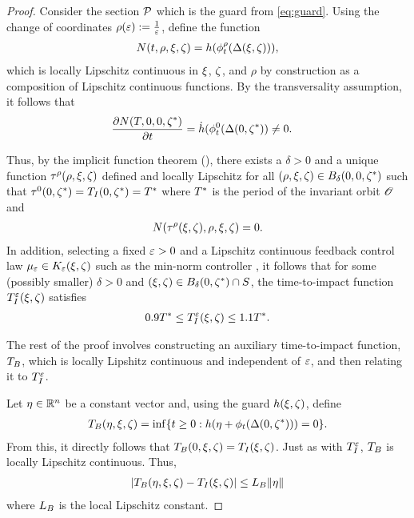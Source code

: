 \begin{proof}
  Consider the \Poincare{} section $\mathcal{P}$ which is the guard from
  \eqref{eq:guard}.
  Using the change of coordinates $\rho(\varepsilon) :=
  \tfrac{1}{\varepsilon}$, define the function
  \begin{align*}
    N(t, \rho, \xi, \zeta) = h(\phi^{\rho}_{t}(\Delta(\xi, \zeta))),
  \end{align*}
  which is locally Lipschitz continuous in $\xi$, $\zeta$, and $\rho$ by
  construction as a composition of Lipschitz continuous functions.
  By the transversality assumption, it follows that
  \begin{align*}
    \frac{\partial{N(T, 0, 0, \zeta^{*})}}{\partial{t}} &= \dot h(\phi^{0}_{t} (\Delta(0, \zeta^{*})) \ne
    0.
  \end{align*}

  Thus, by the implicit function theorem (\cite{Sun2001}), there exists a
  $\delta > 0$ and a unique function $\tau^{\rho}(\rho, \xi, \zeta)$ defined and
  locally Lipschitz for all $(\rho, \xi, \zeta) \in B_{\delta}(0, 0, \zeta^{*})$
  such that $\tau^{0}(0, \zeta^{*}) = T_{I}(0, \zeta^{*}) = T^{*}$ where $T^{*}$ is the
  period of the invariant orbit ${\mathscr O}$ and
  \begin{align*}
    N(\tau^{\rho}(\xi, \zeta), \rho, \xi, \zeta) = 0.
  \end{align*}
  In addition, selecting a fixed  $\varepsilon > 0$ and a Lipschitz continuous
  feedback control law $\mu_{\varepsilon} \in K_{\varepsilon}(\xi, \zeta)$ such as the min-norm controller
  \cite{Freeman1996}, it follows that for some (possibly smaller) $\delta > 0$
  and $(\xi, \zeta) \in B_{\delta}(0, \zeta^{*}) \cap S$, the time-to-impact function
  $T_{I}^{\varepsilon}(\xi, \zeta)$ satisfies
  \begin{align}
    \label{eq:TIe-bounds}
    0.9 T^{*} \leq T_{I}^{\varepsilon}(\xi, \zeta) \leq 1.1 T^{*}.
  \end{align}
  
  The rest of the proof involves constructing an auxiliary time-to-impact
  function, $T_{B}$, which is locally Lipshitz continuous and independent of
  $\varepsilon$, and then relating it to $T_{I}^{\varepsilon}$.
  
  Let $\eta \in \mathbb{R}^{n}$ be a constant vector and, using the guard $h(\xi, \zeta)$,
  define
  \begin{align*}
    T_{B}(\eta, \xi, \zeta) = \inf\{t \geq 0 : h(\eta + \phi_{t}(\Delta(0, \zeta^{*})))
    = 0\}.
  \end{align*}
  From this, it directly follows that $T_{B}(0, \xi, \zeta) = T_{I}(\xi, \zeta)$.
  Just as with $T_{I}^{\varepsilon}$, $T_{B}$ is locally Lipschitz continuous.
  Thus,
  \begin{align*}
    | T_{B}(\eta, \xi, \zeta) - T_{I}(\xi, \zeta) | \leq L_{B} \| \eta \|
  \end{align*}
  where $L_{B}$ is the local Lipschitz constant.


\end{proof}
